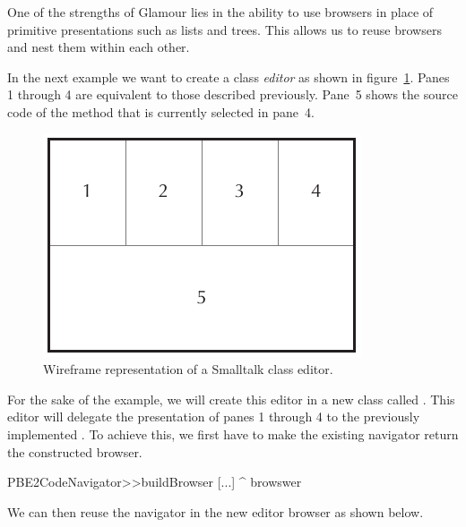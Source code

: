 \documentclass[a4paper,10pt,twoside]{book}
\begin{document}
One of the strengths of Glamour lies in the ability to use browsers in
place of primitive presentations such as lists and trees. This allows
us to reuse browsers and nest them within each other.

In the next example we want to create a class \emph{editor} as shown
in figure~\ref{fig:classbrowser_wireframe}. Panes 1 through 4 are
equivalent to those described previously. Pane~5 shows the source code
of the method that is currently selected in pane~4.

\begin{figure}[htbp]
\centerline{\includegraphics[width=\linewidth]{classbrowser_wireframe.pdf}}
\caption{Wireframe representation of a Smalltalk class editor.}
\label{fig:classbrowser_wireframe}
\end{figure}

For the sake of the example, we will create this editor in a new class
called . This editor will delegate the presentation
of panes 1 through 4 to the previously implemented
. To achieve this, we first have to make the
existing navigator return the constructed browser.

\begin{code}{}
PBE2CodeNavigator>>buildBrowser
  [...]
  ^ browswer
\end{code}

We can then reuse the navigator in the new editor browser as shown
below.
\end{document}
